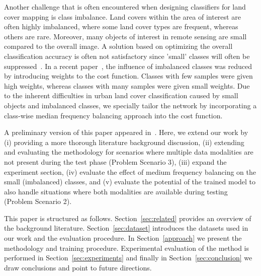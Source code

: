 \documentclass[journal]{IEEEtran}
\begin{document}
Another challenge that is often encountered when designing classifiers for land cover mapping is class imbalance.
Land covers within the area of interest are often highly imbalanced, where some land cover types are frequent, whereas others are rare.
Moreover, many objects of interest in remote sensing are small compared to the overall image.
A solution based on optimizing the overall classification accuracy is often not satisfactory since 'small' classes will often be suppressed~\cite{estabrooks2004multiple}. In a recent paper~\cite{kampffmeyer2016semantic}, the influence of imbalanced classes was reduced by introducing weights to the cost function. Classes with few samples were given high weights, whereas classes with many samples were given small weights.
Due to the inherent difficulties in urban land cover classification caused by small objects and imbalanced classes, we specially tailor the network by incorporating a class-wise median frequency balancing approach into the cost function.

A preliminary version of this paper appeared in~\cite{kampffmeyer2017igarss}. Here, we extend our work by
(i) providing a more thorough literature background discussion,
(ii) extending and evaluating the methodology for scenarios where multiple data modalities are not present during the test phase (Problem Scenario 3),
(iii) expand the experiment section,
(iv) evaluate the effect of medium frequency balancing on the small (imbalanced) classes, and
(v) evaluate the potential of the trained model to also handle situations where both modalities are available during testing (Problem Scenario 2).

This paper is structured as follows. Section~\ref{sec:related} provides an overview of the background literature. Section~\ref{sec:dataset} introduces the datasets used in our work and the evaluation procedure. In Section~\ref{approach} we present the methodology and training procedure. Experimental evaluation of the method is performed in Section~\ref{sec:experiments} and finally in Section~\ref{sec:conclusion} we draw conclusions and point to future directions.
\end{document}
